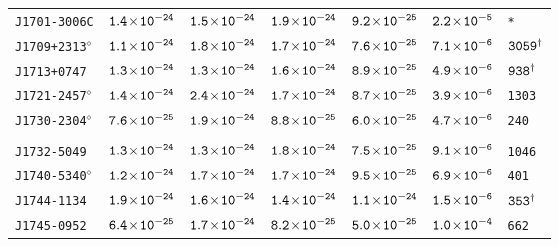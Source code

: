 \begin{longtable}{l | c | c | c | c | c | l}
\\[-20pt] 
\scriptsize{\tt{J1701-3006C}} & \scriptsize{$\tt{1.4\!\times\!10^{-24}}$} & \scriptsize{$\tt{1.5\!\times\!10^{-24}}$} & \scriptsize{$\tt{1.9\!\times\!10^{-24}}$} & \scriptsize{$\tt{9.2\!\times\!10^{-25}}$} & \scriptsize{$\tt{2.2\!\times\!10^{-5}}$} & \scriptsize{\tt{*}} \\[-16pt] 
\scriptsize{\tt{J1709+2313}$^{\diamond}$} & \scriptsize{$\tt{1.1\!\times\!10^{-24}}$} &
\scriptsize{$\tt{1.8\!\times\!10^{-24}}$} & \scriptsize{$\tt{1.7\!\times\!10^{-24}}$} & \scriptsize{$\tt{7.6\!\times\!10^{-25}}$}
& \scriptsize{$\tt{7.1\!\times\!10^{-6}}$} & \scriptsize{$\tt{3059^{\dagger}}$} \\[-16pt] 
\scriptsize{\tt{J1713+0747}} & \scriptsize{$\tt{1.3\!\times\!10^{-24}}$} & \scriptsize{$\tt{1.3\!\times\!10^{-24}}$} & \scriptsize{$\tt{1.6\!\times\!10^{-24}}$} & \scriptsize{$\tt{8.9\!\times\!10^{-25}}$} & \scriptsize{$\tt{4.9\!\times\!10^{-6}}$} & \scriptsize{$\tt{938^{\dagger}}$} \\[-16pt] 
\scriptsize{\tt{J1721-2457}$^{\diamond}$} & \scriptsize{$\tt{1.4\!\times\!10^{-24}}$} &
\scriptsize{$\tt{2.4\!\times\!10^{-24}}$} & \scriptsize{$\tt{1.7\!\times\!10^{-24}}$} &\scriptsize{$\tt{8.7\!\times\!10^{-25}}$} &
\scriptsize{$\tt{3.9\!\times\!10^{-6}}$} & \scriptsize{\tt{1303}} \\[-16pt] 
\scriptsize{\tt{J1730-2304}$^{\diamond}$} & \scriptsize{$\tt{7.6\!\times\!10^{-25}}$} &
\scriptsize{$\tt{1.9\!\times\!10^{-24}}$} & \scriptsize{$\tt{8.8\!\times\!10^{-25}}$} &\scriptsize{$\tt{6.0\!\times\!10^{-25}}$} &
\scriptsize{$\tt{4.7\!\times\!10^{-6}}$} & \scriptsize{\tt{240}} \\[-16pt] 
\\[-20pt] 
\scriptsize{\tt{J1732-5049}} & \scriptsize{$\tt{1.3\!\times\!10^{-24}}$} & \scriptsize{$\tt{1.3\!\times\!10^{-24}}$} & \scriptsize{$\tt{1.8\!\times\!10^{-24}}$} &\scriptsize{$\tt{7.5\!\times\!10^{-25}}$} & \scriptsize{$\tt{9.1\!\times\!10^{-6}}$} & \scriptsize{\tt{1046}} \\[-16pt] 
\scriptsize{\tt{J1740-5340}$^{\diamond}$} & \scriptsize{$\tt{1.2\!\times\!10^{-24}}$} &
\scriptsize{$\tt{1.7\!\times\!10^{-24}}$} & \scriptsize{$\tt{1.7\!\times\!10^{-24}}$} &\scriptsize{$\tt{9.5\!\times\!10^{-25}}$} &
\scriptsize{$\tt{6.9\!\times\!10^{-6}}$} & \scriptsize{\tt{401}} \\[-16pt] 
\scriptsize{\tt{J1744-1134}} & \scriptsize{$\tt{1.9\!\times\!10^{-24}}$} & \scriptsize{$\tt{1.6\!\times\!10^{-24}}$} & \scriptsize{$\tt{1.4\!\times\!10^{-24}}$} & \scriptsize{$\tt{1.1\!\times\!10^{-24}}$} & \scriptsize{$\tt{1.5\!\times\!10^{-6}}$} & \scriptsize{$\tt{353^{\dagger}}$} \\[-16pt] 
\scriptsize{\tt{J1745-0952}} & \scriptsize{$\tt{6.4\!\times\!10^{-25}}$} & \scriptsize{$\tt{1.7\!\times\!10^{-24}}$} & \scriptsize{$\tt{8.2\!\times\!10^{-25}}$} &\scriptsize{$\tt{5.0\!\times\!10^{-25}}$} & \scriptsize{$\tt{1.0\!\times\!10^{-4}}$} & \scriptsize{\tt{662}} \\[-16pt] 

\end{longtable}
